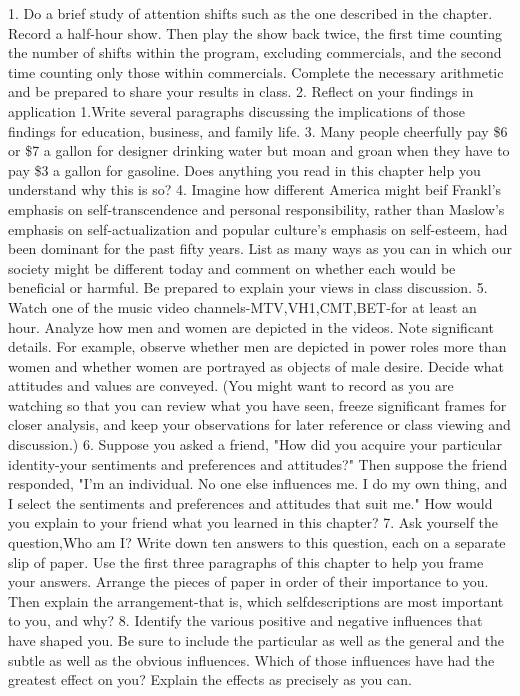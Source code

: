 \documentclass{book}
\begin{document}
1. Do a brief study of attention shifts such as the one described in the chapter. Record a half-hour show. Then play the show back twice, the first time counting the number of shifts within the program, excluding commercials, and the second time counting only those within commercials. Complete the necessary arithmetic and be prepared to share your results in class.
2. Reflect on your findings in application 1.Write several paragraphs discussing the implications of those findings for education, business, and family life.
3. Many people cheerfully pay \$6 or \$7 a gallon for designer drinking water but moan and groan when they have to pay \$3 a gallon for gasoline. Does anything you read in this chapter help you understand why this is so?
4. Imagine how different America might beif Frankl’s emphasis on self-transcendence and personal responsibility, rather than Maslow’s emphasis on self-actualization and popular culture’s emphasis on self-esteem, had been dominant for the past fifty years. List as many ways as you can in which our society might be different today and comment on whether each would be beneficial or harmful. Be prepared to explain your views in class discussion.
5. Watch one of the music video channels-MTV,VH1,CMT,BET-for at least an hour. Analyze how men and women are depicted in the videos. Note significant details. For example, observe whether men are depicted in power roles more than women and whether women are portrayed as objects of male desire. Decide what attitudes and values are conveyed. (You might want to record as you are watching so that you can review what you have seen, freeze significant frames for closer analysis, and keep your observations for later reference or class viewing and discussion.)
6. Suppose you asked a friend, "How did you acquire your particular identity-your sentiments and preferences and attitudes?" Then suppose the friend responded, "I’m an individual. No one else influences me. I do my own thing, and I select the sentiments and preferences and attitudes that suit me." How would you explain to your friend what you learned in this chapter?
7. Ask yourself the question,Who am I? Write down ten answers to this question, each on a separate slip of paper. Use the first three paragraphs of this chapter to help you frame your answers. Arrange the pieces of paper in order of their importance to you. Then explain the arrangement-that is, which selfdescriptions are most important to you, and why?
8. Identify the various positive and negative influences that have shaped you. Be sure to include the particular as well as the general and the subtle as well as the obvious influences. Which of those influences have had the greatest effect on you? Explain the effects as precisely as you can.
\end{document}
